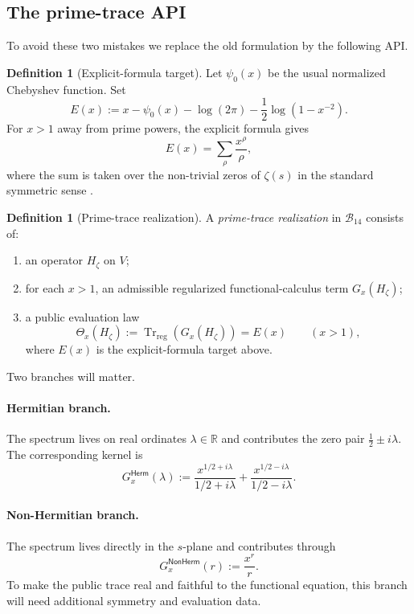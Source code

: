 \documentclass[11pt,a4paper]{article}
\theoremstyle{plain}
\theoremstyle{definition}
\newtheorem{definition}[theorem]{Definition}
\theoremstyle{remark}
\newcommand{\R}{\mathbb{R}}
\newcommand{\Bcal}{\mathcal{B}}
\newcommand{\Trreg}{\operatorname{Tr}_{\mathrm{reg}}}
\newcommand{\herm}{\ensuremath{\mathsf{Herm}}}
\newcommand{\nonherm}{\ensuremath{\mathsf{NonHerm}}}
\begin{document}
\subsection{The prime-trace API}

To avoid these two mistakes we replace the old formulation by the following API.

\begin{definition}[Explicit-formula target]
Let $\psi_0(x)$ be the usual normalized Chebyshev function. Set
\[
E(x):=x-\psi_0(x)-\log(2\pi)-\frac12\log(1-x^{-2}).
\]
For $x>1$ away from prime powers, the explicit formula gives
\[
E(x)=\sum_{\rho}\frac{x^{\rho}}{\rho},
\]
where the sum is taken over the non-trivial zeros of $\zeta(s)$ in the standard symmetric sense \citep{titchmarsh,edwards}.
\end{definition}

\begin{definition}[Prime-trace realization]
\label{def:primetrace}
A \emph{prime-trace realization} in $\Bcal_{14}$ consists of:
\begin{enumerate}[label=(\roman*),leftmargin=2em]
  \item an operator $H_\zeta$ on $V$;
  \item for each $x>1$, an admissible regularized functional-calculus term $G_x(H_\zeta)$;
  \item a public evaluation law
  \[
  \Theta_x(H_\zeta):=\Trreg(G_x(H_\zeta))=E(x)
  \qquad (x>1),
  \]
  where $E(x)$ is the explicit-formula target above.
\end{enumerate}
\end{definition}

Two branches will matter.

\paragraph{Hermitian branch.}
The spectrum lives on real ordinates $\lambda\in\R$ and contributes the zero pair $\frac12\pm i\lambda$. The corresponding kernel is
\[
G_x^{\herm}(\lambda)
:= \frac{x^{1/2+i\lambda}}{1/2+i\lambda}
 + \frac{x^{1/2-i\lambda}}{1/2-i\lambda}.
\]

\paragraph{Non-Hermitian branch.}
The spectrum lives directly in the $s$-plane and contributes through
\[
G_x^{\nonherm}(r):=\frac{x^r}{r}.
\]
To make the public trace real and faithful to the functional equation, this branch will need additional symmetry and evaluation data.
\end{document}

